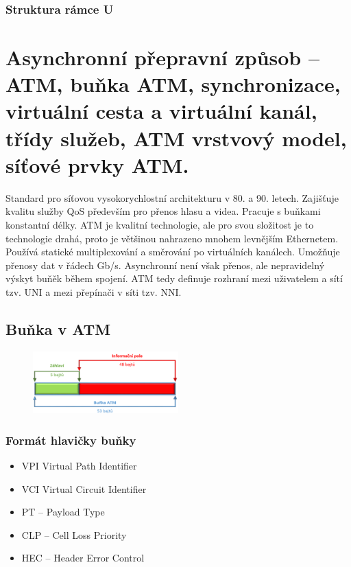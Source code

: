 \subsubsection{Struktura rámce U}


\newpage
\section{Asynchronní přepravní způsob – ATM, buňka ATM, synchronizace, virtuální cesta a virtuální kanál, třídy služeb, ATM vrstvový model, síťové prvky ATM.}
Standard pro síťovou vysokorychlostní architekturu v 80. a 90. letech. Zajišťuje kvalitu služby QoS především pro přenos hlasu a videa. Pracuje s buňkami konstantní délky. ATM je kvalitní technologie, ale pro svou složitost je to technologie drahá, proto je většinou nahrazeno mnohem levnějším Ethernetem. Používá statické multiplexování a směrování po virtuálních kanálech. Umožňuje přenosy dat v řádech Gb/s. Asynchronní není však přenos, ale nepravidelný výskyt buňěk během spojení. ATM tedy definuje rozhraní mezi uživatelem a sítí tzv. UNI a mezi přepínači v síti tzv. NNI.

\subsection{Buňka v ATM}
\begin{figure} [h]
    \centering
    \includegraphics[width=0.5\textwidth]{snimky/ATM bunka.png}
    \label{fig:uml}
\end{figure}

\subsubsection{Formát hlavičky buňky}
\begin{itemize}
    \item VPI Virtual Path Identifier
    \item VCI Virtual Circuit Identifier
    \item PT – Payload Type
    \item CLP – Cell Loss Priority
    \item HEC – Header Error Control
\end{itemize}

